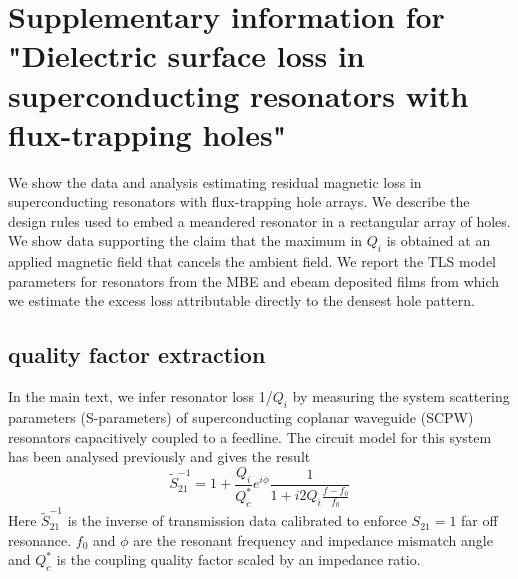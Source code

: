 \newcommand{\beginsupplement}{%
\setcounter{table}{0}
\renewcommand{\thetable}{S\arabic{table}}%
\setcounter{figure}{0}
\renewcommand{\thefigure}{S\arabic{figure}}%
\setcounter{equation}{0}
\renewcommand{\theequation}{S\arabic{equation}}%
}
\beginsupplement
\makeatletter
\makeatother

\chapter[Vortex-supp]{Supplementary information for "Dielectric surface loss in superconducting resonators with flux-trapping holes"}


\def \Bcapp {\text{B}^{\text{cool}}_{\text{applied}}}

We show the data and analysis estimating residual magnetic loss in superconducting resonators with flux-trapping hole arrays. We describe the design rules used to embed a meandered resonator in a rectangular array of holes.  We show data supporting the claim that the maximum in $Q_{i}$ is obtained at an applied magnetic field that cancels the ambient field.  We report the TLS model parameters for resonators from the MBE and ebeam deposited films from which we estimate the excess loss attributable directly to the densest hole pattern.
\section{quality factor extraction}
In the main text, we infer resonator loss 1/$Q_i$ by measuring the system scattering parameters (S-parameters) of superconducting coplanar waveguide (SCPW) resonators capacitively coupled to a feedline.  The circuit model for this system has been analysed previously \cite{megrant2012} and gives the result
\begin{equation}
    \label{spectroscopyS21}
    \tilde{S}_{21}^{-1} = 1 + \frac{Q_{i}}{Q_{c}^{*}}e^{i \phi}\frac{1}{1+i2 Q_{i} \frac{f-f_{0}}{f_{0}}}
\end{equation}
Here $\tilde{S}_{21}^{-1}$ is the inverse of transmission data calibrated to enforce $S_{21}=1$ far off resonance.  $f_{0}$ and $\phi$ are the resonant frequency and impedance mismatch angle and  $Q_{c}^{*}$ is the coupling quality factor scaled by an impedance ratio.

